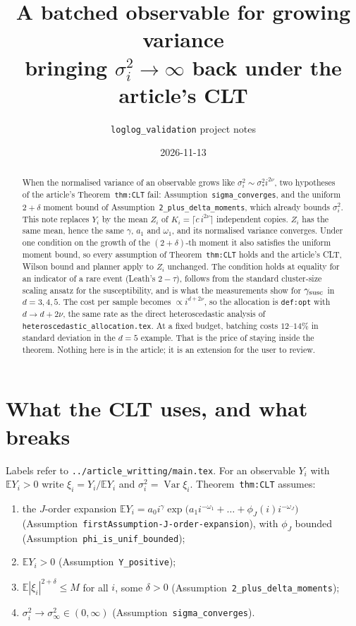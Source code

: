 \documentclass[11pt]{article}
\title{A batched observable for growing variance\\
\large bringing $\sigma_i^2\to\infty$ back under the article's CLT}
\author{\texttt{loglog\_validation} project notes}
\date{2026-11-13}
\newcommand{\E}{\mathbb{E}}
\newcommand{\Var}{\operatorname{Var}}
\newcommand{\lbl}[1]{\texttt{#1}}
\begin{document}
\maketitle

\begin{abstract}
When the normalised variance of an observable grows like
$\sigma_i^2\sim\sigma_*^2 i^{2\nu}$, two hypotheses of the article's
Theorem~\lbl{thm:CLT} fail: Assumption~\lbl{sigma\_converges}, and the
uniform $2+\delta$ moment bound of Assumption~\lbl{2\_plus\_delta\_moments},
which already bounds $\sigma_i^2$. This note replaces $Y_i$ by the mean
$Z_i$ of $K_i=\lceil c\,i^{2\nu}\rceil$ independent copies. $Z_i$ has the same
mean, hence the same $\gamma$, $a_1$ and $\omega_1$, and its normalised
variance converges. Under one condition on the growth of the
$(2+\delta)$-th moment it also satisfies the uniform moment bound, so every
assumption of Theorem~\lbl{thm:CLT} holds and the article's CLT, Wilson bound
and planner apply to $Z_i$ unchanged. The condition holds at equality for an
indicator of a rare event (Leath's $2-\tau$), follows from the standard
cluster-size scaling ansatz for the susceptibility, and is what the
measurements show for $\gamma_{\rm susc}$ in $d=3,4,5$. The cost per sample
becomes $\propto i^{d+2\nu}$, so the allocation is \lbl{def:opt} with
$d\to d+2\nu$, the same rate as the direct heteroscedastic analysis of
\texttt{heteroscedastic\_allocation.tex}. At a fixed budget, batching costs
$12$--$14\%$ in standard deviation in the $d=5$ example. That is the price of
staying inside the theorem.
Nothing here is in the article; it is an extension for the user to review.
\end{abstract}

\tableofcontents

\section{What the CLT uses, and what breaks}

Labels refer to \texttt{../article\_writting/main.tex}. For an observable
$Y_i$ with $\E Y_i>0$ write $\xi_i=Y_i/\E Y_i$ and $\sigma_i^2=\Var\xi_i$.
Theorem~\lbl{thm:CLT} assumes:

\begin{enumerate}
  \item[(A1)] the $J$-order expansion
  $\E Y_i=a_0i^\gamma\exp\bigl(a_1i^{-\omega_1}+\dots+\phi_J(i)i^{-\omega_J}\bigr)$
  (Assumption~\lbl{firstAssumption-}\allowbreak\lbl{J-order-expansion}), with $\phi_J$
  bounded (Assumption~\lbl{phi\_is\_unif\_bounded});
  \item[(A2)] $\E Y_i>0$ (Assumption~\lbl{Y\_positive});
  \item[(A3)] $\E|\xi_i|^{2+\delta}\le M$ for all $i$, some $\delta>0$
  (Assumption~\lbl{2\_plus\_delta\_moments});
  \item[(A4)] $\sigma_i^2\to\sigma_\infty^2\in(0,\infty)$
  (Assumption~\lbl{sigma\_converges}).
\end{enumerate}
\end{document}
